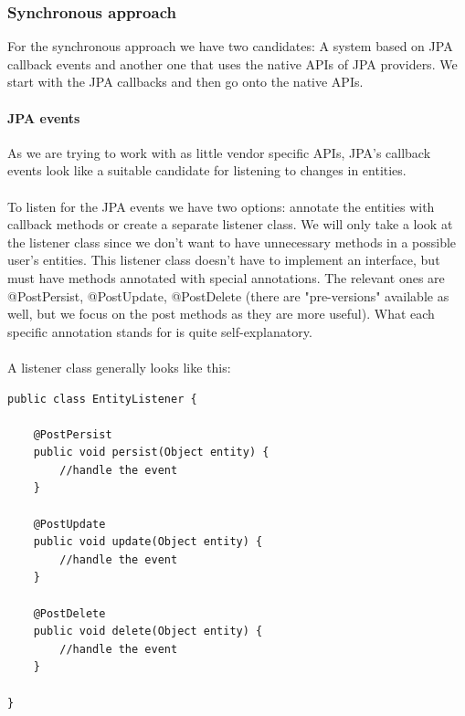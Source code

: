 \pagebreak

\subsubsection{Synchronous approach}

For the synchronous approach we have two candidates: A system based on JPA callback events and another one that uses the native APIs of JPA providers. We start with the JPA callbacks and then go onto the native APIs.

\paragraph{JPA events}

As we are trying to work with as little vendor specific APIs, JPA's callback events look like a suitable candidate for listening to changes in entities.
\\\\
To listen for the JPA events we have two options: annotate the entities with callback methods or create a separate listener class. We will only take a look at the listener class since we don't want to have unnecessary methods in a possible user's entities. This listener class doesn't have to implement an interface, but must have methods annotated with special annotations. The relevant ones are @PostPersist, @PostUpdate, @PostDelete (there are "pre-versions" available as well, but we focus on the post methods as they are more useful). What each specific annotation stands for is quite self-explanatory.
\\\\
A listener class generally looks like this:
\\
\lstset{language=java}
\begin{lstlisting}[frame=htrbl, caption={Example JPA entity listener}, label={lst:jpa_entity_listener.java}]
public class EntityListener {

	@PostPersist
	public void persist(Object entity) {
		//handle the event
	}
	
	@PostUpdate
	public void update(Object entity) {
		//handle the event
	}
	
	@PostDelete
	public void delete(Object entity) {
		//handle the event
	}

}
\end{lstlisting}

\pagebreak


